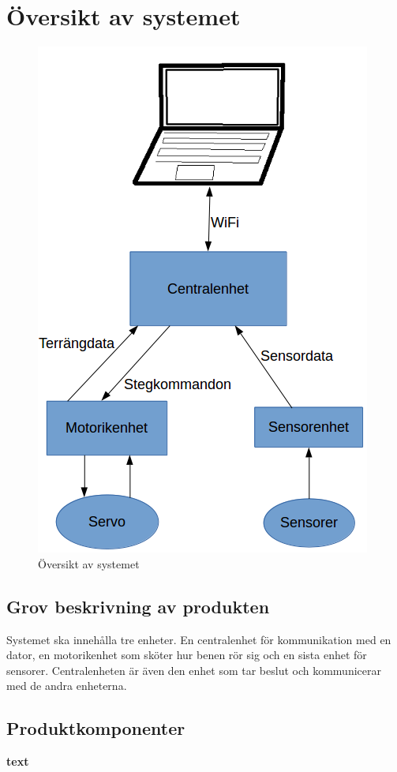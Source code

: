 \documentclass[a4paper,titlepage,12pt]{article}
\begin{document}
	\section{Översikt av systemet}
	\begin{figure}[h!]
		\centering
		\includegraphics[width=0.8\linewidth]{images/overview.png}
		\caption{Översikt av systemet}
		\label{fig:images/overview}
	\end{figure}
	\subsection{Grov beskrivning av produkten}
	Systemet ska innehålla tre enheter. En centralenhet för kommunikation med en dator,
	en motorikenhet som sköter hur benen rör sig och en sista enhet för sensorer.
	Centralenheten är även den enhet som tar beslut och kommunicerar med de 
	andra enheterna. 

	\subsection{Produktkomponenter}
	\textbf{text}
\end{document}
